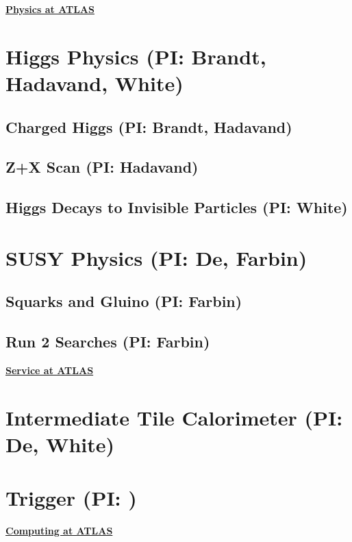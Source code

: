 \documentclass[11pt]{article}
\def\twohead#1{\section{#1}}
\def\threehead#1{\subsection{#1}}
\begin{document}
\begin{center}
\underline{\textbf{\huge Physics at ATLAS}}
\end{center}
\twohead{Higgs Physics (PI: Brandt, Hadavand, White)}



\threehead{Charged Higgs (PI: Brandt, Hadavand)}


\threehead{Z+X Scan (PI: Hadavand)}


\threehead{Higgs Decays to Invisible Particles (PI: White)}


\twohead{SUSY Physics (PI: De, Farbin)}



\threehead{Squarks and Gluino (PI: Farbin)}

\threehead{Run 2 Searches (PI: Farbin)}



\begin{center}
\underline{\textbf{\huge Service at ATLAS}}
\end{center}

\twohead{Intermediate Tile Calorimeter (PI: De, White)}


\twohead{Trigger (PI: )}



\begin{center}
\underline{\textbf{\huge Computing at ATLAS}}
\end{center}
\end{document}
